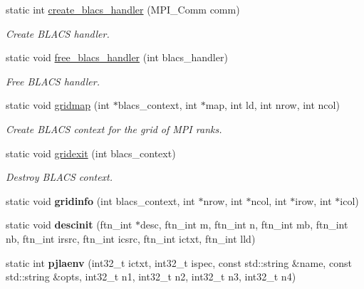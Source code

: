 \begin{DoxyCompactItemize}
\item 
static int \hyperlink{classsddk_1_1linalg__base_a8166494efb19ac4d5f8fd0ac7660dc30}{create\+\_\+blacs\+\_\+handler} (M\+P\+I\+\_\+\+Comm comm)
\begin{DoxyCompactList}\small\item\em Create B\+L\+A\+C\+S handler. \end{DoxyCompactList}\item 
static void \hyperlink{classsddk_1_1linalg__base_aee91be9b979482febad882ea797c7db8}{free\+\_\+blacs\+\_\+handler} (int blacs\+\_\+handler)
\begin{DoxyCompactList}\small\item\em Free B\+L\+A\+C\+S handler. \end{DoxyCompactList}\item 
static void \hyperlink{classsddk_1_1linalg__base_a3ecb0334c753798746b93261105691b5}{gridmap} (int $\ast$blacs\+\_\+context, int $\ast$map, int ld, int nrow, int ncol)
\begin{DoxyCompactList}\small\item\em Create B\+L\+A\+C\+S context for the grid of M\+P\+I ranks. \end{DoxyCompactList}\item 
static void \hyperlink{classsddk_1_1linalg__base_a4f772dc60a67957b6f66fce9b6dbb053}{gridexit} (int blacs\+\_\+context)
\begin{DoxyCompactList}\small\item\em Destroy B\+L\+A\+C\+S context. \end{DoxyCompactList}\item 
\hypertarget{classsddk_1_1linalg__base_adf9fe59269a6033a8a69a35e9e938edf}{}static void {\bfseries gridinfo} (int blacs\+\_\+context, int $\ast$nrow, int $\ast$ncol, int $\ast$irow, int $\ast$icol)\label{classsddk_1_1linalg__base_adf9fe59269a6033a8a69a35e9e938edf}

\item 
\hypertarget{classsddk_1_1linalg__base_aca20fa278abf6b9502233626ebfa5132}{}static void {\bfseries descinit} (ftn\+\_\+int $\ast$desc, ftn\+\_\+int m, ftn\+\_\+int n, ftn\+\_\+int mb, ftn\+\_\+int nb, ftn\+\_\+int irsrc, ftn\+\_\+int icsrc, ftn\+\_\+int ictxt, ftn\+\_\+int lld)\label{classsddk_1_1linalg__base_aca20fa278abf6b9502233626ebfa5132}

\item 
\hypertarget{classsddk_1_1linalg__base_a0e0c6bc7e316122a8e7e39825b1466c7}{}static int {\bfseries pjlaenv} (int32\+\_\+t ictxt, int32\+\_\+t ispec, const std\+::string \&name, const std\+::string \&opts, int32\+\_\+t n1, int32\+\_\+t n2, int32\+\_\+t n3, int32\+\_\+t n4)\label{classsddk_1_1linalg__base_a0e0c6bc7e316122a8e7e39825b1466c7}


\end{DoxyCompactItemize}
